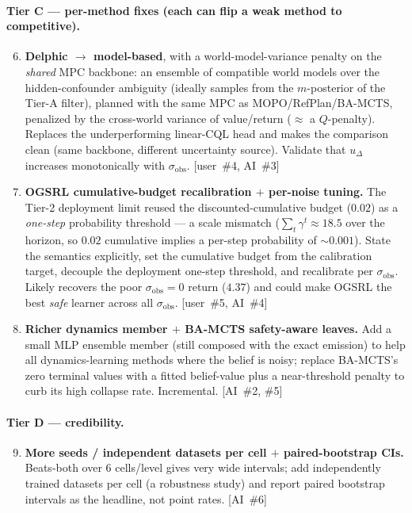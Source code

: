 \documentclass[11pt]{article}
\newcommand{\sobs}{\sigma_{\mathrm{obs}}}
\begin{document}
\paragraph{Tier C --- per-method fixes (each can flip a weak method to competitive).}
\begin{enumerate}[leftmargin=1.8em,nosep]
\setcounter{enumi}{5}
\item \textbf{Delphic $\rightarrow$ model-based}, with a world-model-variance
penalty on the \emph{shared} MPC backbone: an ensemble of compatible world models
over the hidden-confounder ambiguity (ideally samples from the $m$-posterior of the
Tier-A filter), planned with the same MPC as MOPO/RefPlan/BA-MCTS, penalized by the
cross-world variance of value/return ($\approx$ a $Q$-penalty). Replaces the
underperforming linear-CQL head and makes the comparison clean (same backbone,
different uncertainty source). Validate that $u_\Delta$ increases monotonically
with $\sobs$. [user~\#4, AI~\#3]
\item \textbf{OGSRL cumulative-budget recalibration $+$ per-noise tuning.} The
Tier-2 deployment limit reused the discounted-cumulative budget ($0.02$) as a
\emph{one-step} probability threshold --- a scale mismatch ($\sum_t\gamma^t\approx
18.5$ over the horizon, so $0.02$ cumulative implies a per-step probability of
$\sim\!0.001$). State the semantics explicitly, set the cumulative budget from the
calibration target, decouple the deployment one-step threshold, and recalibrate per
$\sobs$. Likely recovers the poor $\sobs{=}0$ return ($4.37$) and could make OGSRL
the best \emph{safe} learner across all $\sobs$. [user~\#5, AI~\#4]
\item \textbf{Richer dynamics member $+$ BA-MCTS safety-aware leaves.} Add a small
MLP ensemble member (still composed with the exact emission) to help all
dynamics-learning methods where the belief is noisy; replace BA-MCTS's zero
terminal values with a fitted belief-value plus a near-threshold penalty to curb
its high collapse rate. Incremental. [AI~\#2, \#5]
\end{enumerate}

\paragraph{Tier D --- credibility.}
\begin{enumerate}[leftmargin=1.8em,nosep]
\setcounter{enumi}{8}
\item \textbf{More seeds / independent datasets per cell $+$ paired-bootstrap CIs.}
Beats-both over $6$ cells/level gives very wide intervals; add independently
trained datasets per cell (a robustness study) and report paired bootstrap
intervals as the headline, not point rates. [AI~\#6]
\end{enumerate}
\end{document}

